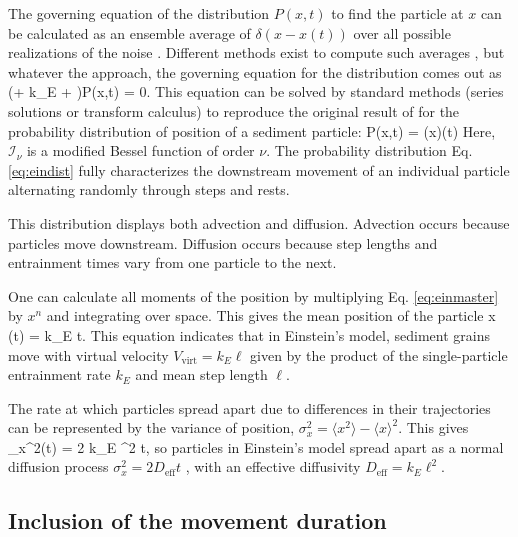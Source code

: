 The governing equation of the distribution $P(x,t)$ to find the particle at $x$ can be calculated as an ensemble average of $\delta(x-x(t))$ over all possible realizations of the noise \citep{Risken1989,Moss1989}. Different methods exist to compute such averages \citep{Hanggi1978, Hanggi1984a, Balakrishnan1993, VanDenBroeck1983}, but whatever the approach, the governing equation for the distribution comes out as
\be  \big(\ell \px \pt + k_E \ell \px + \pt \big)P(x,t) = 0. \label{eq:einmaster}\ee
This equation can be solved by standard methods (series solutions or transform calculus) \citep{Arfken1985,Prudnikov1992a} to reproduce the original result of \citet{Einstein1937} for the probability distribution of position of a sediment particle:
\be P(x,t) = \theta(x)\theta(t) \label{eq:eindist} \ee
Here, $\mathcal{I}_\nu$ is a modified Bessel function of order $\nu$. 
The probability distribution Eq. \ref{eq:eindist} fully characterizes the downstream movement of an individual particle alternating randomly through steps and rests.

This distribution displays both advection and diffusion. Advection occurs because particles move downstream. Diffusion occurs because step lengths and entrainment times vary from one particle to the next.

One can calculate all moments of the position by multiplying Eq. \ref{eq:einmaster} by $x^n$ and integrating over space. This gives the mean position of the particle
\be \langle x (t)  \rangle = k_E \ell t. \ee
This equation indicates that in Einstein's model, sediment grains move with virtual velocity $V_\text{virt} = k_E \ell$ given by the product of the single-particle entrainment rate $k_E$ and mean step length $\ell$.

The rate at which particles spread apart due to differences in their trajectories can be represented by the variance of position, $\sigma_x^2  = \langle x^2 \rangle - \langle x \rangle^2$. This gives
\be \sigma_x^2(t) = 2 k_E \ell^2 t, \ee
so particles in Einstein's model spread apart as a normal diffusion process $\sigma_x^2 = 2 D_\text{eff} t$ \citep{Sokolov2012}, with an effective diffusivity $D_\text{eff} = k_E \ell^2.$

\subsection{Inclusion of the movement duration}
\label{sec:lisle}

